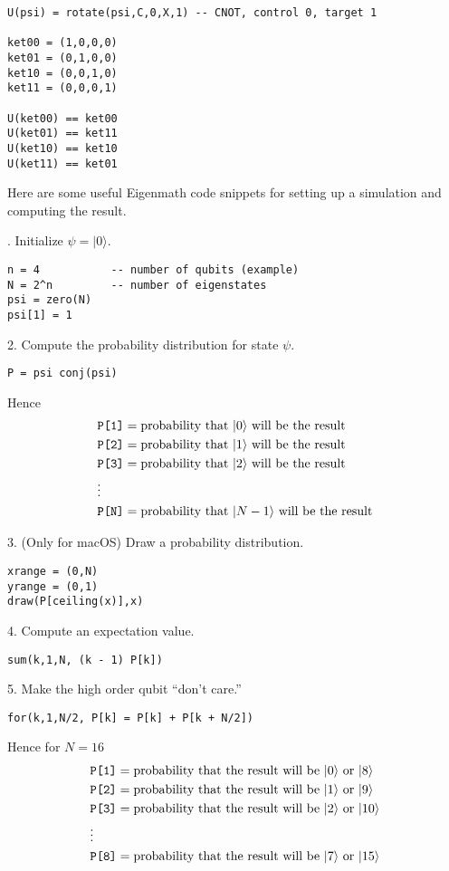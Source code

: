 \documentclass[12pt]{article}
\begin{document}
{\color{blue}
\begin{verbatim}
U(psi) = rotate(psi,C,0,X,1) -- CNOT, control 0, target 1

ket00 = (1,0,0,0)
ket01 = (0,1,0,0)
ket10 = (0,0,1,0)
ket11 = (0,0,0,1)

U(ket00) == ket00
U(ket01) == ket11
U(ket10) == ket10
U(ket11) == ket01
\end{verbatim}
}

Here are some useful Eigenmath code snippets for setting up a simulation
and computing the result.

. Initialize $\psi=|0\rangle$.
{\color{blue}
\begin{verbatim}
n = 4           -- number of qubits (example)
N = 2^n         -- number of eigenstates
psi = zero(N)
psi[1] = 1
\end{verbatim}
}

2. Compute the probability distribution for state $\psi$.
{\color{blue}
\begin{verbatim}
P = psi conj(psi)
\end{verbatim}
}

Hence
\begin{align*}
&\text{\tt P[1]}=\text{probability that $|0\rangle$ will be the result}
\\
&\text{\tt P[2]}=\text{probability that $|1\rangle$ will be the result}
\\
&\text{\tt P[3]}=\text{probability that $|2\rangle$ will be the result}
\\
&\vdots
\\
&\text{\tt P[N]}=\text{probability that $|N-1\rangle$ will be the result}
\end{align*}

3. (Only for macOS) Draw a probability distribution.
{\color{blue}
\begin{verbatim}
xrange = (0,N)
yrange = (0,1)
draw(P[ceiling(x)],x)
\end{verbatim}
}

4. Compute an expectation value.
{\color{blue}
\begin{verbatim}
sum(k,1,N, (k - 1) P[k])
\end{verbatim}
}

5. Make the high order qubit ``don't care.''
{\color{blue}
\begin{verbatim}
for(k,1,N/2, P[k] = P[k] + P[k + N/2])
\end{verbatim}
}

Hence for $N=16$
\begin{align*}
&\text{\tt P[1]}=\text{probability that the result will be $|0\rangle$ or $|8\rangle$}
\\
&\text{\tt P[2]}=\text{probability that the result will be $|1\rangle$ or $|9\rangle$}
\\
&\text{\tt P[3]}=\text{probability that the result will be $|2\rangle$ or $|10\rangle$}
\\
&\vdots
\\
&\text{\tt P[8]}=\text{probability that the result will be $|7\rangle$ or $|15\rangle$}
\end{align*}
\end{document}
